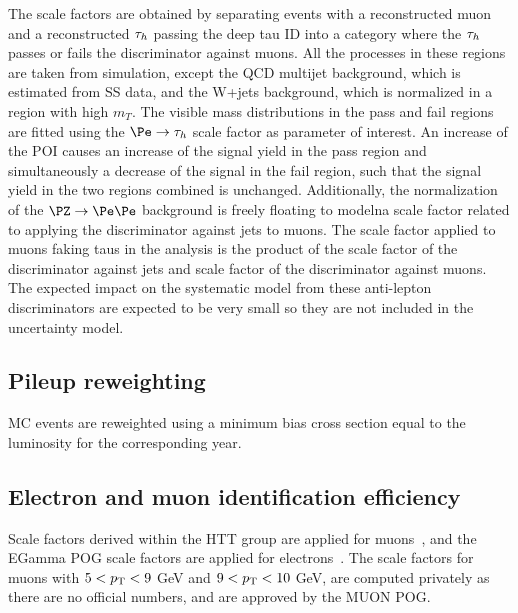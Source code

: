 The scale factors are obtained by separating events with a reconstructed muon and a reconstructed $\tau_h$ passing
the deep tau ID into a category where the $\tau_h$ passes or fails the discriminator against muons. All the processes in
these regions are taken from simulation, except the QCD multijet background, which is estimated from SS data, and the W+jets background, which is normalized in a region with high $m_T$. The visible mass distributions in the pass and fail regions are fitted using the $\Pe\to\tauh$ scale factor as parameter of interest. An increase of the POI causes an increase of the signal yield in the pass region and simultaneously a decrease of the signal in the fail region, such that the signal yield in the two regions combined is unchanged. Additionally, the normalization of the $\PZ\to\Pe\Pe$ background is freely floating to modelna scale
factor related to applying the discriminator against jets to muons. The scale factor applied to muons faking taus in the 
analysis is the product of the scale factor of the discriminator against jets and scale factor of the discriminator against muons.
The expected impact on the systematic model from these anti-lepton discriminators are expected to be very small so they are not included in the uncertainty model.




\subsection{Pileup reweighting}

MC events are reweighted using a minimum bias cross section equal to the luminosity for the corresponding year.

\subsection{Electron and muon identification efficiency}

Scale factors derived within the HTT group are applied for muons~\cite{AN16355}, and the EGamma POG scale factors are applied for electrons~\cite{EGammaMVAID}. The scale factors for muons with $5<p_{\mathrm{T}}<9$ GeV and $9<p_{\mathrm{T}}<10$ GeV, are computed privately as there are no official numbers, and are approved by the MUON POG. 
  
